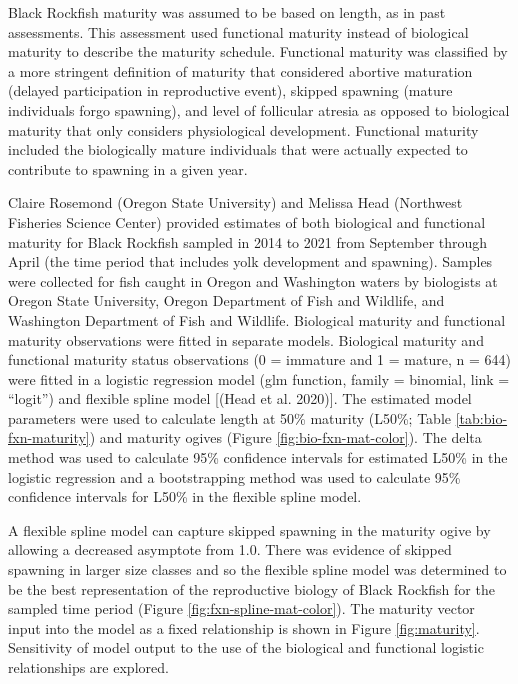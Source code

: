 \documentclass[11pt,
  english,
  letterpaper,
]{article}
\begin{document}
Black Rockfish maturity was assumed to be based on length, as in past assessments. This assessment used functional maturity instead of biological maturity to describe the maturity schedule. Functional maturity was classified by a more stringent definition of maturity that considered abortive maturation (delayed participation in reproductive event), skipped spawning (mature individuals forgo spawning), and level of follicular atresia as opposed to biological maturity that only considers physiological development. Functional maturity included the biologically mature individuals that were actually expected to contribute to spawning in a given year.

Claire Rosemond (Oregon State University) and Melissa Head (Northwest Fisheries Science Center) provided estimates of both biological and functional maturity for Black Rockfish sampled in 2014 to 2021 from September through April (the time period that includes yolk development and spawning). Samples were collected for fish caught in Oregon and Washington waters by biologists at Oregon State University, Oregon Department of Fish and Wildlife, and Washington Department of Fish and Wildlife. Biological maturity and functional maturity observations were fitted in separate models. Biological maturity and functional maturity status observations (0 = immature and 1 = mature, n = 644) were fitted in a logistic regression model (glm function, family = binomial, link = ``logit'') and flexible spline model {[}(Head et al. 2020){]}. The estimated model parameters were used to calculate length at 50\% maturity (L50\%; Table \ref{tab:bio-fxn-maturity}) and maturity ogives (Figure \ref{fig:bio-fxn-mat-color}). The delta method was used to calculate 95\% confidence intervals for estimated L50\% in the logistic regression and a bootstrapping method was used to calculate 95\% confidence intervals for L50\% in the flexible spline model.

A flexible spline model can capture skipped spawning in the maturity ogive by allowing a decreased asymptote from 1.0. There was evidence of skipped spawning in larger size classes and so the flexible spline model was determined to be the best representation of the reproductive biology of Black Rockfish for the sampled time period (Figure \ref{fig:fxn-spline-mat-color}). The maturity vector input into the model as a fixed relationship is shown in Figure \ref{fig:maturity}. Sensitivity of model output to the use of the biological and functional logistic relationships are explored.
\end{document}
